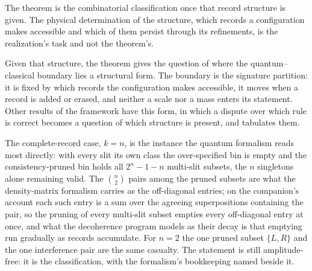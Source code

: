 \noindent The theorem is the combinatorial classification once that record structure is given. The physical determination of the structure, which records a configuration makes accessible and which of them persist through its refinements, is the realization's task and not the theorem's.

\noindent Given that structure, the theorem gives the question of where the quantum--classical boundary lies a structural form. The boundary is the signature partition: it is fixed by which records the configuration makes accessible, it moves when a record is added or erased, and neither a scale nor a mass enters its statement. Other results of the framework have this form, in which a dispute over which rule is correct becomes a question of which structure is present, and \cite{AethusBrief} tabulates them.

\noindent The complete-record case, $k = n$, is the instance the quantum formalism reads most directly: with every slit its own class the over-specified bin is empty and the consistency-pruned bin holds all $2^{n} - 1 - n$ multi-slit subsets, the $n$ singletons alone remaining valid. The $\binom{n}{2}$ pairs among the pruned subsets are what the density-matrix formalism carries as the off-diagonal entries; on the companion's account each such entry is a sum over the agreeing superpositions containing the pair, so the pruning of every multi-slit subset empties every off-diagonal entry at once, and what the decoherence program models as their decay \cite{zurek2003} is that emptying run gradually as records accumulate. For $n = 2$ the one pruned subset $\{L, R\}$ and the one interference pair are the same casualty. The statement is still amplitude-free: it is the classification, with the formalism's bookkeeping named beside it.



